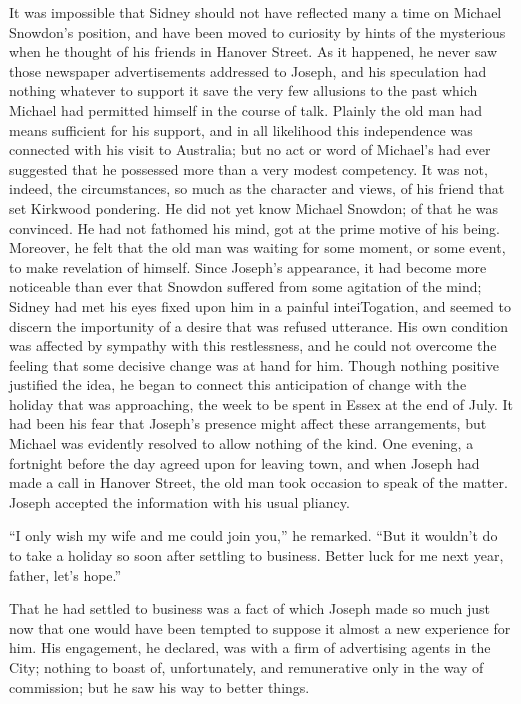 It was impossible that Sidney should not have reflected many a time on
Michael Snowdon's position, and have been moved to curiosity by hints of
the mysterious when he thought of his friends in Hanover Street. As it
happened, he never saw those newspaper advertisements addressed to
Joseph, and his speculation had nothing whatever to support it save the
very few allusions to the past which Michael had permitted himself in
the course of talk. Plainly the old man had means sufficient for his
support, and in all likelihood this independence was connected with his
visit to Australia; but no act or word of Michael's had ever suggested
that he possessed more than a very modest competency. It was not,
indeed, the circumstances, so much as the character and views, of his
friend that set Kirkwood pondering. He did not yet know Michael Snowdon;
of that he was {\protect\hypertarget{106}{}{}}convinced. He had not
fathomed his mind, got at the prime motive of his being. Moreover, he
felt that the old man was waiting for some moment, or some event, to
make revelation of himself. Since Joseph's appearance, it had become
more noticeable than ever that Snowdon suffered from some agitation of
the mind; Sidney had met his eyes fixed upon him in a painful
inteiTogation, and seemed to discern the importunity of a desire that
was refused utterance. His own condition was affected by sympathy with
this restlessness, and he could not overcome the feeling that some
decisive change was at hand for him. Though nothing positive justified
the idea, he began to connect this anticipation of change with the
holiday that was approaching, the week to be spent in Essex at the end
of July. It had been his fear that Joseph's presence might affect these
arrangements, but Michael was evidently resolved to allow nothing of the
kind. One evening, a fortnight before the day agreed upon for leaving
town, and when Joseph had made a call in
{\protect\hypertarget{107}{}{}}Hanover Street, the old man took occasion
to speak of the matter. Joseph accepted the information with his usual
pliancy.

``I only wish my wife and me could join you,'' he remarked. ``But it
wouldn't do to take a holiday so soon after settling to business. Better
luck for me next year, father, let's hope.''

That he had settled to business was a fact of which Joseph made so much
just now that one would have been tempted to suppose it almost a new
experience for him. His engagement, he declared, was with a firm of
advertising agents in the City; nothing to boast of, unfortunately, and
remunerative only in the way of commission; but he saw his way to better
things.

